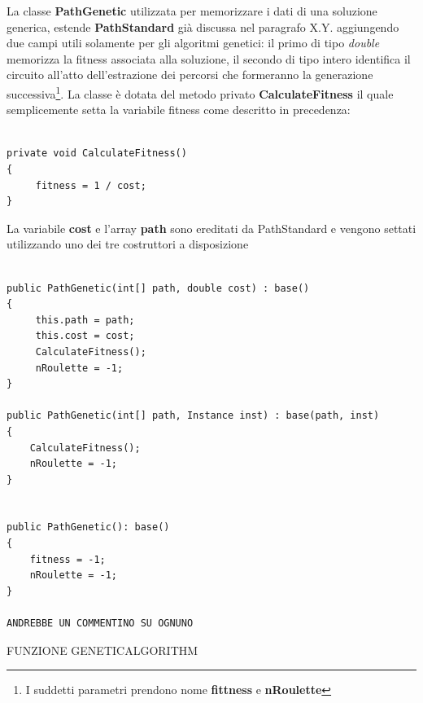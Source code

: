 \documentclass[11pt]{article}
\begin{document}
La classe \textbf{PathGenetic} utilizzata per memorizzare i dati di una soluzione generica, estende \textbf{PathStandard} già discussa nel paragrafo X.Y. aggiungendo due campi utili solamente per gli algoritmi genetici: il primo di tipo \textit{double} memorizza la fitness associata alla soluzione, il secondo di tipo intero identifica il circuito all'atto dell'estrazione dei percorsi che formeranno la generazione successiva\footnote{I suddetti parametri prendono nome \textbf{fittness} e \textbf{nRoulette}}.
La classe è dotata del metodo privato \textbf{CalculateFitness} il quale semplicemente setta la variabile fitness come descritto in precedenza:


\begin{lstlisting}

private void CalculateFitness()
{
     fitness = 1 / cost;
}

\end{lstlisting}

La variabile \textbf{cost} e l’array \textbf{path} sono ereditati da PathStandard e vengono settati utilizzando uno dei tre costruttori a disposizione

\begin{lstlisting}

public PathGenetic(int[] path, double cost) : base()
{
     this.path = path;
     this.cost = cost;
     CalculateFitness();
     nRoulette = -1;
}

public PathGenetic(int[] path, Instance inst) : base(path, inst)
{
    CalculateFitness();
    nRoulette = -1;
}

       
public PathGenetic(): base()
{
    fitness = -1;
    nRoulette = -1;
}

ANDREBBE UN COMMENTINO SU OGNUNO

\end{lstlisting}

\vspace{2\baselineskip}
FUNZIONE GENETICALGORITHM
\vspace{2\baselineskip}
\end{document}
